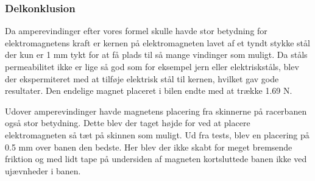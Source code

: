 \subsubsection{Delkonklusion}
Da amperevindinger efter vores formel skulle havde stor betydning for elektromagnetens kraft er kernen på elektromagneten lavet af et tyndt stykke stål der kun er 1 mm tykt for at få plads til så mange vindinger som muligt. Da ståls permeabilitet ikke er lige så god som for eksempel jern eller elektriskståls, blev der ekspermiteret med at tilføje elektrisk stål til kernen, hvilket gav gode resultater. Den endelige magnet placeret i bilen endte med at trække 1.69 N.

Udover amperevindinger havde magnetens placering fra skinnerne på racerbanen også stor betydning. Dette blev der taget højde for ved at placere elektromagneten så tæt på skinnen som muligt. Ud fra tests, blev en placering på 0.5 mm over banen den bedste. Her blev der ikke skabt for meget bremsende friktion og med lidt tape på undersiden af magneten kortsluttede banen ikke ved ujævnheder i banen.
